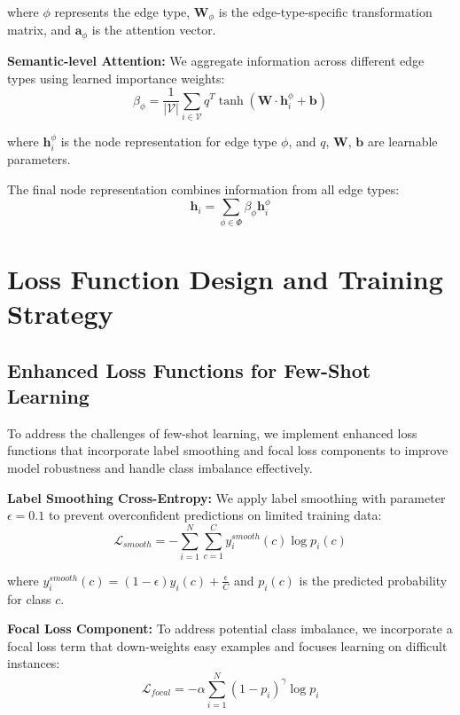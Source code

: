 where $\phi$ represents the edge type, $\mathbf{W}_{\phi}$ is the edge-type-specific transformation matrix, and $\mathbf{a}_{\phi}$ is the attention vector.

\textbf{Semantic-level Attention:} We aggregate information across different edge types using learned importance weights:
\begin{equation}
\beta_{\phi} = \frac{1}{|\mathcal{V}|} \sum_{i \in \mathcal{V}} q^T \tanh(\mathbf{W} \cdot \mathbf{h}_i^{\phi} + \mathbf{b})
\end{equation}

where $\mathbf{h}_i^{\phi}$ is the node representation for edge type $\phi$, and $q$, $\mathbf{W}$, $\mathbf{b}$ are learnable parameters.

The final node representation combines information from all edge types:
\begin{equation}
\mathbf{h}_i = \sum_{\phi \in \Phi} \beta_{\phi} \mathbf{h}_i^{\phi}
\end{equation}

\section{Loss Function Design and Training Strategy}

\subsection{Enhanced Loss Functions for Few-Shot Learning}

To address the challenges of few-shot learning, we implement enhanced loss functions that incorporate label smoothing and focal loss components to improve model robustness and handle class imbalance effectively.

\textbf{Label Smoothing Cross-Entropy:} We apply label smoothing with parameter $\epsilon = 0.1$ to prevent overconfident predictions on limited training data:
\begin{equation}
\mathcal{L}_{smooth} = -\sum_{i=1}^{N} \sum_{c=1}^{C} y_i^{smooth}(c) \log p_i(c)
\end{equation}

where $y_i^{smooth}(c) = (1-\epsilon)y_i(c) + \frac{\epsilon}{C}$ and $p_i(c)$ is the predicted probability for class $c$.

\textbf{Focal Loss Component:} To address potential class imbalance, we incorporate a focal loss term that down-weights easy examples and focuses learning on difficult instances:
\begin{equation}
\mathcal{L}_{focal} = -\alpha \sum_{i=1}^{N} (1-p_i)^{\gamma} \log p_i
\end{equation}

